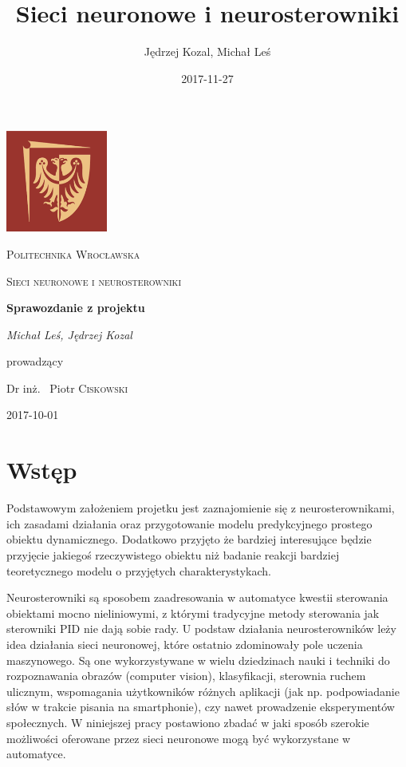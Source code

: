 \documentclass{article}
\title{Sieci neuronowe i neurosterowniki}
\date{2017-11-27}
\author{Jędrzej Kozal, Michał Leś}
\begin{document}
\begin{titlepage}
	\centering
	\includegraphics[width=0.25\textwidth]{logo_pol_wroclaw.png}\par\vspace{1cm}
	{\scshape\LARGE Politechnika Wrocławska \par}
	\vspace{1cm}
	{\scshape\Large Sieci neuronowe i neurosterowniki \par}
	\vspace{1.5cm}
	{\huge\bfseries Sprawozdanie z projektu \par}
	\vspace{2cm}
	{\Large\itshape Michał Leś, Jędrzej Kozal\par}
	\vfill
	prowadzący\par
	Dr inż. ~Piotr \textsc{Ciskowski}

	\vfill

	{\large 2017-10-01\par}
\end{titlepage}

\section{Wstęp}
Podstawowym założeniem projetku jest zaznajomienie się z neurosterownikami, ich zasadami działania oraz przygotowanie modelu predykcyjnego prostego obiektu dynamicznego. Dodatkowo przyjęto że bardziej interesujące będzie przyjęcie jakiegoś rzeczywistego obiektu niż badanie reakcji bardziej teoretycznego modelu o przyjętych charakterystykach.

Neurosterowniki są sposobem zaadresowania w automatyce kwestii sterowania obiektami mocno nieliniowymi, z którymi tradycyjne metody sterowania jak sterowniki PID nie dają sobie rady. U podstaw działania neurosterowników leży idea działania sieci neuronowej, które ostatnio zdominowały pole uczenia maszynowego. Są one wykorzystywane w wielu dziedzinach nauki i techniki do rozpoznawania obrazów (computer vision), klasyfikacji, sterownia ruchem ulicznym, wspomagania użytkowników różnych aplikacji (jak np. podpowiadanie słów w trakcie pisania na smartphonie), czy nawet prowadzenie eksperymentów społecznych. W niniejszej pracy postawiono zbadać w jaki sposób szerokie możliwości oferowane przez sieci neuronowe mogą być wykorzystane w automatyce.
\end{document}
